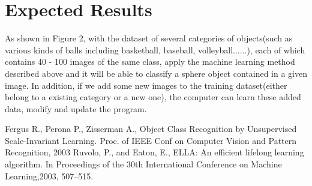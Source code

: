 \documentclass[CEJM,PDF]{cej} %
\begin{document}
\section{Expected Results}
\vspace*{-10pt}
As shown in Figure 2, with the dataset of several categories of objects(such as various kinds of balls including basketball, baseball, volleyball......), each of which contains 40 - 100 images of the same class, apply the machine learning method described above and it will be able to classify a sphere object contained in a given image. In addition, if we add some new images to the training dataset(either belong to a existing category or a new one), the computer can learn these added data, modify and update the program.

\begin{thebibliography}{9}
 Fergus R., Perona P., Zisserman A., Object Class Recognition by Unsupervised Scale-Invariant Learning. Proc. of IEEE Conf on Computer Vision and Pattern Recognition, 2003
 Ruvolo, P., and Eaton, E., ELLA: An efficient lifelong learning algorithm. In Proceedings of the 30th International Conference on Machine Learning,2003,  507–515.
\end{thebibliography}
\end{document}
